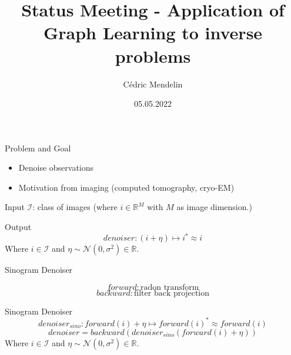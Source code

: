 \documentclass[aspectratio=169]{beamer}
\title              {Status Meeting - Application of Graph Learning to inverse problems}
\author     		{Cédric Mendelin}
\institute          {Department of Mathematics and Computer Science, University of Basel}
\date               {05.05.2022}
\begin{document}

\begin{frame}[t,plain]
    \titlepage
\end{frame}




\begin{frame}{Problem and Goal}
    \begin{itemize}
        \item Denoise observations
        \item Motivation from imaging (computed tomography, cryo-EM)
    \end{itemize}

    \pause
    \begin{block}{Input}
        $\mathcal{I}$: class of images (where $i \in \mathbb{R}^M$ with $M$ as image dimension.)
    \end{block}

    \begin{block}{Output}
        $$ denoiser:   (i + \eta) \mapsto i^* \approx i $$ 
        \center
        Where $i \in \mathcal{I}$ and $\eta \sim \mathcal{N}(0,\sigma^2) \in \mathbb{R}$.
    \end{block}

\end{frame}

\begin{frame}{Sinogram Denoiser}
    \begin{block}{}
        $$ forward : \text{radon transform} $$
        $$ backward : \text{filter back projection} $$
    \end{block}    
    
    \pause

    \begin{block}{Sinogram Denoiser}
        $$ denoiser_{sino}:  forward(i) + \eta \mapsto forward(i)^* \approx forward(i) $$ 
        $$ denoiser = backward ( denoiser_{sino}(forward(i) + \eta)) $$
        \center
        Where $i \in \mathcal{I}$ and $\eta \sim \mathcal{N}(0,\sigma^2) \in \mathbb{R}$.
    \end{block}
\end{frame}
\end{document}
